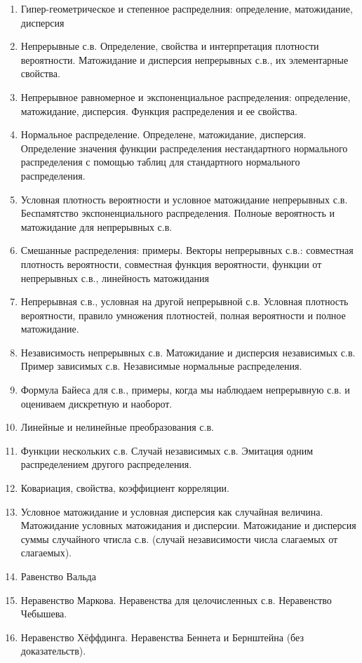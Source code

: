 \documentclass[12pt]{article}
\begin{document}
\begin{enumerate}
  \item Гипер-геометрическое и степенное распределния: определение, матожидание, дисперсия
  \item Непрерывные с.в. Определение, свойства и интерпретация плотности вероятности. Матожидание и дисперсия непрерывных с.в., их элементарные свойства.
  \item Непрерывное равномерное и экспоненциальное распределения: определение, матожидание, дисперсия. Функция распределения и ее свойства.
  \item Нормальное распределение. Определене, матожидание, дисперсия. Определение значения функции распределения нестандартного нормального распределения с помощью таблиц для стандартного нормального распределения.
  \item Условная плотность вероятности и условное матожидание непрерывных с.в. Беспамятство экспоненциального распределения. Полноые вероятность и матожидание для непрерывных с.в.
  \item Смешанные распределения: примеры. Векторы непрерывных с.в.: совместная плотность вероятности, совместная функция вероятности, функции от непрерывных с.в., линейность матожидания
  \item Непрерывная с.в., условная на другой непрерывной с.в. Условная плотность вероятности, правило умножения плотностей, полная вероятности и полное матожидание.
  \item Независимость непрерывных с.в. Матожидание и дисперсия независимых с.в. Пример зависимых с.в. Независимые нормальные распределения.
  \item Формула Байеса для с.в., примеры, когда мы наблюдаем непрерывную с.в. и оцениваем дискретную и наоборот.
  \item Линейные и нелинейные преобразования с.в.
  \item Функции нескольких с.в. Случай независимых с.в. Эмитация одним распределением другого распределения.
  \item Ковариация, свойства, коэффициент корреляции.
  \item Условное матожидание и условная дисперсия как случайная величина. Матожидание условных матожидания и дисперсии. Матожидание и дисперсия суммы случайного чтисла с.в. (случай независимости числа слагаемых от слагаемых).
  \item Равенство Вальда
  \item Неравенство Маркова. Неравенства для целочисленных с.в. Неравенство Чебышева.
  \item Неравенство Хёффдинга. Неравенства Беннета и Бернштейна (без доказательств).

\end{enumerate}
\end{document}
